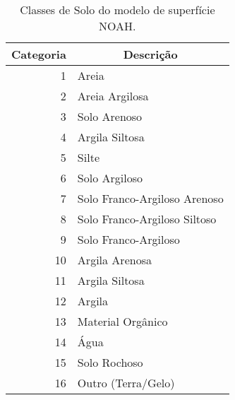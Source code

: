 \begin{table}[htbp]
\caption{Classes de Solo do modelo de superfície NOAH.}
\label{tab06}
\centering
\begin{tabular}{r|l|l|l|l|l}
\hline
\multicolumn{1}{l|}{Categoria} & \multicolumn{ 5}{c}{Descrição} \\ \hline
1  & \multicolumn{ 5}{l}{Areia} \\
2  & \multicolumn{ 5}{l}{Areia Argilosa} \\
3  & \multicolumn{ 5}{l}{Solo Arenoso} \\
4  & \multicolumn{ 5}{l}{Argila Siltosa} \\
5  & \multicolumn{ 5}{l}{Silte} \\
6  & \multicolumn{ 5}{l}{Solo Argiloso} \\
7  & \multicolumn{ 5}{l}{Solo Franco-Argiloso Arenoso} \\
8  & \multicolumn{ 5}{l}{Solo Franco-Argiloso Siltoso} \\
9  & \multicolumn{ 5}{l}{Solo Franco-Argiloso} \\
10 & \multicolumn{ 5}{l}{Argila Arenosa} \\
11 & \multicolumn{ 5}{l}{Argila Siltosa} \\
12 & \multicolumn{ 5}{l}{Argila} \\
13 & \multicolumn{ 5}{l}{Material Orgânico} \\ 
14 & \multicolumn{ 5}{l}{Água} \\
15 & \multicolumn{ 5}{l}{Solo Rochoso} \\
16 & \multicolumn{ 5}{l}{Outro (Terra/Gelo)} \\ \hline
\end{tabular}
\label{Tabela das Classes de Solo}
\end{table}

